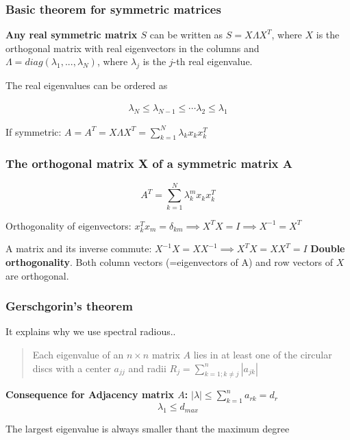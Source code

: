\subsubsection{Basic theorem for symmetric matrices}
\textbf{Any real symmetric matrix $S$} can be written as $S = X \Lambda X^T$,
where $X$ is the orthogonal matrix with real eigenvectors in the columns and 
$\Lambda = diag(\lambda_1, ..., \lambda_N)$, where $\lambda_j$ is the $j$-th real eigenvalue.

The real eigenvalues can be ordered as

\begin{gather*}
  \lambda_N \le \lambda_{N-1} \le \cdots \lambda_2 \le \lambda_1
\end{gather*}

If symmetric: $A = A^T = X \Lambda X^T = \sum_{k=1}^{N} \lambda_k x_k x^T_k$

\subsubsection{The orthogonal matrix X of a symmetric matrix A}

$$
A^T = \sum_{k=1}^N \lambda_k^m x_k x^T_k
$$

Orthogonality of eigenvectors: $x_k^T x_m = \delta_{km} \implies X^T X = I \implies X^{-1} = X^T$

A matrix and its inverse commute: $X^{-1}X = X X^{-1} \implies X^TX = XX^T = I$ \textbf{Double
orthogonality}. Both column vectors (=eigenvectors of A) and row vectors of $X$ are orthogonal.

\subsubsection{Gerschgorin's theorem}

It explains why we use spectral radious..

\begin{quotation}
  Each eigenvalue of an $n\times n$ matrix $A$ lies in at least one of the circular discs
  with a center $a_{jj}$ and radii $R_j = \sum_{k=1;k \ne j}^n |a_{jk}|$
\end{quotation}

\textbf{Consequence for Adjacency matrix $A$: } $|\lambda| \le \sum_{k=1}^n a_{rk} = d_r$
$$
\lambda_1 \le d_{max}
$$

The largest eigenvalue is always smaller thant the maximum degree

